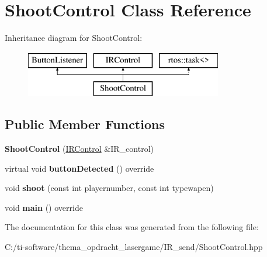 \hypertarget{class_shoot_control}{}\section{Shoot\+Control Class Reference}
\label{class_shoot_control}
Inheritance diagram for Shoot\+Control\+:\begin{figure}[H]
\begin{center}
\leavevmode
\includegraphics[height=2.000000cm]{class_shoot_control}
\end{center}
\end{figure}
\subsection*{Public Member Functions}
\begin{DoxyCompactItemize}
\item 
\mbox{\label{class_shoot_control_a90a3fa56f1c3a7131c95eab240794f28}} 
{\bfseries Shoot\+Control} (\mbox{\hyperlink{class_i_r_control}{I\+R\+Control}} \&I\+R\+\_\+control)
\item 
\mbox{\label{class_shoot_control_ab5a9b55187693bdb2f49c4ae4a5de039}} 
virtual void {\bfseries button\+Detected} () override
\item 
\mbox{\label{class_shoot_control_ad4fbd66576dc4389d57d00aaa414fca8}} 
void {\bfseries shoot} (const int playernumber, const int typewapen)
\item 
\mbox{\label{class_shoot_control_afda9df061db3b34fdf9affed32f2c325}} 
void {\bfseries main} () override
\end{DoxyCompactItemize}


The documentation for this class was generated from the following file\+:\begin{DoxyCompactItemize}
\item 
C\+:/ti-\/software/thema\+\_\+opdracht\+\_\+lasergame/\+I\+R\+\_\+send/Shoot\+Control.\+hpp\end{DoxyCompactItemize}
